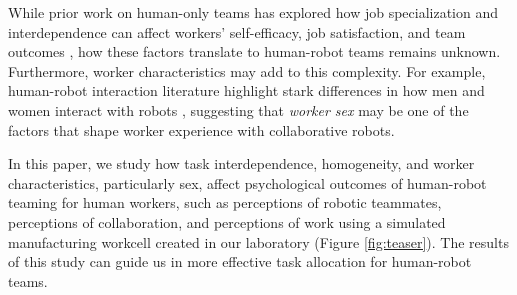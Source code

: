 While prior work on human-only teams has explored how job specialization and interdependence can affect workers' self-efficacy, job satisfaction, and team outcomes \cite{miller1973job,kuijer1999job,hsieh2004reassessment}, how these factors translate to human-robot teams remains unknown. Furthermore, worker characteristics may add to this complexity. For example, human-robot interaction literature highlight stark differences in how men and women interact with robots  \cite{schermerhorn2008robot}, suggesting that \textit{worker sex} may be one of the factors that shape worker experience with collaborative robots.
       
In this paper, we study how task interdependence, homogeneity, and worker characteristics, particularly sex, affect psychological outcomes of human-robot teaming for human workers, such as perceptions of robotic teammates, perceptions of collaboration, and perceptions of work using a simulated manufacturing workcell created in our laboratory (Figure \ref{fig:teaser}). The results of this study can guide us in more effective task allocation for human-robot teams.

